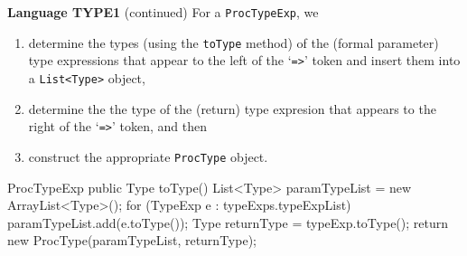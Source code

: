 \begin{minipage}[t]{\sw}
\slidenumber
\LARGE
{\bf Language TYPE1} (continued)\exx
For a \verb'ProcTypeExp', we\
\begin{enumerate}
\item determine the types (using the \verb'toType' method)
of the (formal parameter) type expressions
that appear to the left of the `\verb'=>'' token
and insert them into a \verb'List<Type>' object,
\item determine the the type of the (return) type expresion that appears
to the right of the `\verb'=>'' token, and then
\item
construct the appropriate \verb'ProcType' object.
\end{enumerate}
\Large
\begin{qv}
ProcTypeExp
    public Type toType() {
        List<Type> paramTypeList = new ArrayList<Type>();
        for (TypeExp e : typeExps.typeExpList)
            paramTypeList.add(e.toType());
        Type returnType = typeExp.toType();
        return new ProcType(paramTypeList, returnType);
    }
\end{qv}
\end{minipage}
